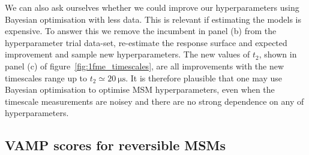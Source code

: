 \documentclass[journal=jacsat,manuscript=article]{achemso}
\begin{document}
We can also ask ourselves whether we could improve our hyperparameters using Bayesian optimisation with less data. This is relevant if estimating the models is expensive. To answer this we remove the incumbent in panel (b) from the hyperparameter trial data-set, re-estimate the response surface and expected improvement and sample new hyperparameters. The new values of $t_2$,  shown in panel (c) of figure~\ref{fig:1fme_timescales}, are all improvements with the new timescales range up to $t_2 \simeq \SI{20}{\micro\second}$. It is therefore plausible that one may use Bayesian optimisation to optimise MSM hyperparameters, even when the timescale measurements are noisey and there are no strong dependence on any of hyperparameters.  



\subsection{VAMP scores for reversible MSMs}
\end{document}
